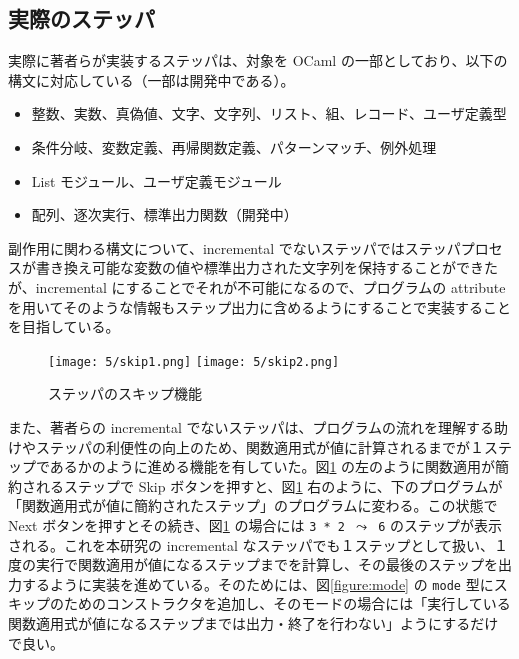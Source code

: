\subsection{実際のステッパ}
\label{実装-実際のステッパ}

実際に著者らが実装するステッパは、対象を OCaml の一部としており、以下の構文に対応している（一部は開発中である）。
\begin{itemize}
\item 整数、実数、真偽値、文字、文字列、リスト、組、レコード、ユーザ定義型
\item 条件分岐、変数定義、再帰関数定義、パターンマッチ、例外処理
\item List モジュール、ユーザ定義モジュール
\item 配列、逐次実行、標準出力関数（開発中）
\end{itemize}

副作用に関わる構文について、incremental でないステッパ\cite{FSA18}ではステッパプロセスが書き換え可能な変数の値や標準出力された文字列を保持することができたが、incremental にすることでそれが不可能になるので、プログラムの attribute を用いてそのような情報もステップ出力に含めるようにすることで実装することを目指している。

\begin{figure}
  \texttt{[image: 5/skip1.png]}
  \texttt{[image: 5/skip2.png]}
  \caption{ステッパのスキップ機能}
  \label{figure:skip}
\end{figure}

また、著者らの incremental でないステッパ\cite{FSA18}は、プログラムの流れを理解する助けやステッパの利便性の向上のため、関数適用式が値に計算されるまでが１ステップであるかのように進める機能を有していた。図\ref{figure:skip} の左のように関数適用が簡約されるステップで Skip ボタンを押すと、図\ref{figure:skip} 右のように、下のプログラムが「関数適用式が値に簡約されたステップ」のプログラムに変わる。この状態で Next ボタンを押すとその続き、図\ref{figure:skip} の場合には \texttt{3 * 2 $\leadsto$ 6} のステップが表示される。これを本研究の incremental なステッパでも１ステップとして扱い、１度の実行で関数適用が値になるステップまでを計算し、その最後のステップを出力するように実装を進めている。そのためには、図\ref{figure:mode} の \texttt{mode} 型にスキップのためのコンストラクタを追加し、そのモードの場合には「実行している関数適用式が値になるステップまでは出力・終了を行わない」ようにするだけで良い。
